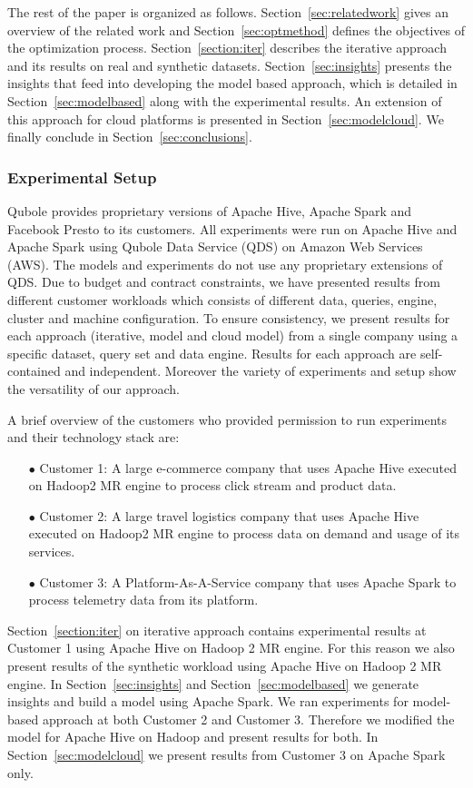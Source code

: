 The rest of the paper is organized as follows. Section~\ref{sec:relatedwork} gives an overview of the related work and Section~\ref{sec:optmethod} defines the objectives of the optimization process. Section~\ref{section:iter} describes the iterative approach and its results on real and synthetic datasets. Section~\ref{sec:insights} presents the insights that feed into developing the model based approach, which is detailed in Section~\ref{sec:modelbased} along with the experimental results. An extension of this approach for cloud platforms is presented in Section~\ref{sec:modelcloud}. We finally conclude in Section~\ref{sec:conclusions}.

\noindent\subsubsection*{Experimental Setup}
Qubole\cite{qubole} provides proprietary versions of Apache Hive\cite{thusoo2009hive}, Apache Spark\cite{zaharia2016apache} and Facebook Presto\cite{presto} to its customers.
All experiments were run on Apache Hive and Apache Spark using Qubole Data Service (QDS) on Amazon Web Services (AWS). 
The models and experiments do not use any proprietary extensions of QDS.  
Due to budget and contract constraints, we have presented results from different customer workloads which consists of different data, queries, engine, cluster and machine configuration.
To ensure consistency, we present results for each approach (iterative, model and cloud model) from a single company using a specific dataset, query set and data engine. 
Results for each approach are self-contained and independent. Moreover the variety of experiments and setup show the versatility of our approach. 

A brief overview of the customers who provided permission to run experiments and their technology stack are:
\begin{enumerate}
	\item[$\bullet$] Customer 1: A large e-commerce company that uses Apache Hive executed on Hadoop2 MR engine to process click stream and product data. 
	\item[$\bullet$] Customer 2: A large travel logistics company that uses Apache Hive executed on Hadoop2 MR engine to process data on demand and usage of its services.
	\item[$\bullet$] Customer 3: A Platform-As-A-Service company that uses Apache Spark to process telemetry data from its platform.
\end{enumerate}

Section~\ref{section:iter} on iterative approach contains experimental results at Customer 1 using Apache Hive on Hadoop 2 MR engine. 
For this reason we also present results of the synthetic workload using Apache Hive on Hadoop 2 MR engine. 
In Section~\ref{sec:insights} and Section~\ref{sec:modelbased} we generate insights and build a model using Apache Spark. 
We ran experiments for model-based approach at both Customer 2 and Customer 3. 
Therefore we modified the model for Apache Hive on Hadoop and present results for both. In Section~\ref{sec:modelcloud} we present results from Customer 3 on Apache Spark only.   
